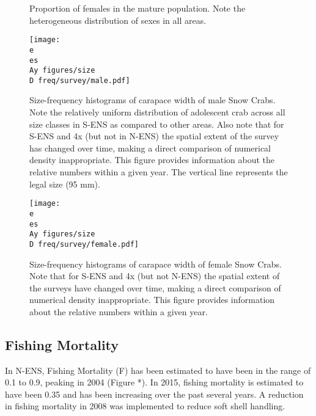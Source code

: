 \documentclass[paper=a4, fontsize=11pt]{article}
\newcommand{\D}{.}
\newcommand{\e}{/home/michelle/ecomod_data/}
\newcommand{\es}{snowcrab/}
\newcommand{\Ay}{assessments/2015/}
\begin{document}
\begin{figure}[h]
  \centering
  \caption{Proportion of females in the mature population. Note the heterogeneous distribution of sexes in all areas.}
\end{figure}
\clearpage


\begin{figure}[h]
    \centering
    \texttt{[image: \\e \\es \\Ay figures/size\\D freq/survey/male.pdf]}
    \caption{Size-frequency histograms of carapace width of male Snow Crabs. Note the relatively uniform distribution of adolescent crab across all size classes in S-ENS as compared to other areas. Also note that for S-ENS and 4x (but not in N-ENS) the spatial extent of the survey has changed over time, making a direct comparison of numerical density inappropriate. This figure provides information about the relative numbers within a given year. The vertical line represents the legal size (95 mm).}
\end{figure}


\begin{figure}[h]
    \centering
    \texttt{[image: \\e \\es \\Ay figures/size\\D freq/survey/female.pdf]}
    \caption{Size-frequency histograms of carapace width of female Snow Crabs. Note that for S-ENS and 4x (but not N-ENS) the spatial extent of the surveys have changed over time, making a direct comparison of numerical density inappropriate. This figure provides information about the relative numbers within a given year.}
\end{figure}
\clearpage

\subsection{Fishing Mortality}

In N-ENS, Fishing Mortality (F) has been estimated to have been in the range of 0.1 to 0.9, peaking in 2004 (Figure *). In 2015, fishing mortality is estimated to have been 0.35 and has been increasing over the past several years. A reduction in fishing mortality in 2008 was implemented to reduce soft shell handling.\\
\end{document}
